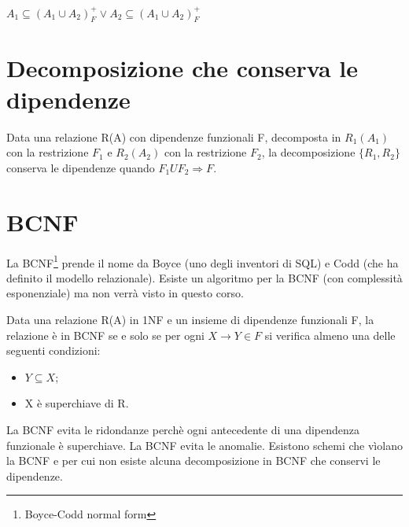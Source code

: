 \begin{center}
    $A_1 \subseteq (A_1 \cup A_2)_F^+ \vee A_2 \subseteq (A_1 \cup A_2)_F^+$
\end{center}

\section{Decomposizione che conserva le dipendenze}

Data una relazione R(A) con dipendenze funzionali F, decomposta in $R_1(A_1)$ con la restrizione $F_1$ e $R_2(A_2)$ con la restrizione $F_2$, la decomposizione $\{R_1,R_2\}$ conserva le dipendenze quando $F_1 U F_2 \Rightarrow F$.

\section{BCNF}

La BCNF\footnote{Boyce-Codd normal form} prende il nome da Boyce (uno degli inventori di SQL) e Codd (che ha definito il modello relazionale). Esiste un algoritmo per la BCNF (con complessità esponenziale) ma non verrà visto in questo corso.

Data una relazione R(A) in 1NF e un insieme di dipendenze funzionali F, la relazione è in BCNF se e solo se per ogni $X \rightarrow Y \in F$ si verifica almeno una delle seguenti condizioni:

\begin{itemize}
    \item $Y \subseteq X$;
    \item X è superchiave di R.
\end{itemize}

La BCNF evita le ridondanze perchè ogni antecedente di una dipendenza funzionale è superchiave. La BCNF evita le anomalie.
Esistono schemi che vìolano la BCNF e per cui non esiste alcuna decomposizione in BCNF che conservi le dipendenze.